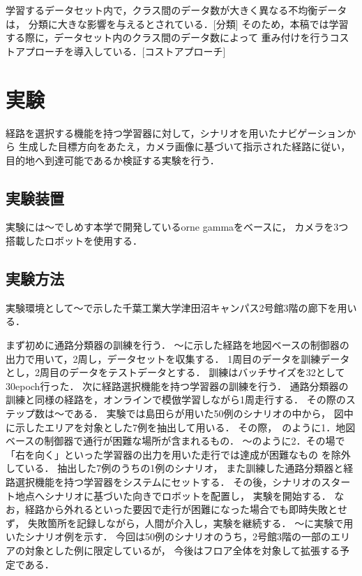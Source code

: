 \documentclass{sice-si}
\begin{document}
学習するデータセット内で，クラス間のデータ数が大きく異なる不均衡データは，
分類に大きな影響を与えるとされている．[分類]
そのため，本稿では学習する際に，データセット内のクラス間のデータ数によって
重み付けを行うコストアプローチを導入している．[コストアプローチ]

\section{実験}
経路を選択する機能を持つ学習器に対して，シナリオを用いたナビゲーションから
生成した目標方向をあたえ，カメラ画像に基づいて指示された経路に従い，
目的地へ到達可能であるか検証する実験を行う．

\subsection{実験装置}
実験には〜でしめす本学で開発しているorne gammaをベースに，
カメラを3つ搭載したロボットを使用する．

\subsection{実験方法}
実験環境として〜で示した千葉工業大学津田沼キャンパス2号館3階の廊下を用いる．

まず初めに通路分類器の訓練を行う．
〜に示した経路を地図ベースの制御器の出力で用いて，2周し，データセットを収集する．
1周目のデータを訓練データとし，2周目のデータをテストデータとする．
訓練はバッチサイズを32として30epoch行った．
次に経路選択機能を持つ学習器の訓練を行う．
通路分類器の訓練と同様の経路を，オンラインで模倣学習しながら1周走行する．
その際のステップ数は〜である．
実験では島田らが用いた50例のシナリオの中から，
図中に示したエリアを対象とした7例を抽出して用いる．
その際，~のように1．地図ベースの制御器で通行が困難な場所が含まれるもの．
〜のように2．その場で「右を向く」といった学習器の出力を用いた走行では達成が困難なもの
を除外している．
抽出した7例のうちの1例のシナリオ，
また訓練した通路分類器と経路選択機能を持つ学習器をシステムにセットする．
その後，シナリオのスタート地点へシナリオに基づいた向きでロボットを配置し，
実験を開始する．
なお，経路から外れるといった要因で走行が困難になった場合でも即時失敗とせず，
失敗箇所を記録しながら，人間が介入し，実験を継続する．
〜に実験で用いたシナリオ例を示す．
今回は50例のシナリオのうち，2号館3階の一部のエリアの対象とした例に限定しているが，
今後はフロア全体を対象して拡張する予定である．
\end{document}

